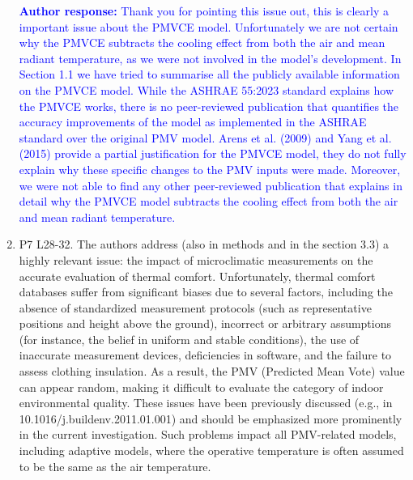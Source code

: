 \documentclass[a4paper, 10pt]{letter}
\newcommand{\response}[1]{\textcolor{blue}{\textbf{Author response:} #1}}
\begin{document}
\begin{letter}
\begin{enumerate}
            \response{
                Thank you for pointing this issue out, this is clearly a important issue about the PMVCE model.
                Unfortunately we are not certain why the PMVCE subtracts the cooling effect from both the air and mean radiant temperature, as we were not involved in the model's development.
                In Section 1.1 we have tried to summarise all the publicly available information on the PMVCE model.
                While the ASHRAE 55:2023 standard explains how the PMVCE works, there is no peer-reviewed publication that quantifies the accuracy improvements of the model as implemented in the ASHRAE standard over the original PMV model.
                Arens et al. (2009) and Yang et al. (2015) provide a partial justification for the PMVCE model, they do not fully explain why these specific changes to the PMV inputs were made.
                Moreover, we were not able to find any other peer-reviewed publication that explains in detail why the PMVCE model subtracts the cooling effect from both the air and mean radiant temperature.
            }

            \item P7 L28-32.
            The authors address (also in methods and in the section 3.3) a highly relevant issue: the impact of microclimatic measurements on the accurate evaluation of thermal comfort.
            Unfortunately, thermal comfort databases suffer from significant biases due to several factors, including the absence of standardized measurement protocols (such as representative positions and height above the ground), incorrect or arbitrary assumptions (for instance, the belief in uniform and stable conditions), the use of inaccurate measurement devices, deficiencies in software, and the failure to assess clothing insulation.
            As a result, the PMV (Predicted Mean Vote) value can appear random, making it difficult to evaluate the category of indoor environmental quality.
            These issues have been previously discussed (e.g., in 10.1016/j.buildenv.2011.01.001) and should be emphasized more prominently in the current investigation.
            Such problems impact all PMV-related models, including adaptive models, where the operative temperature is often assumed to be the same as the air temperature.


\end{enumerate}
\end{letter}
\end{document}
